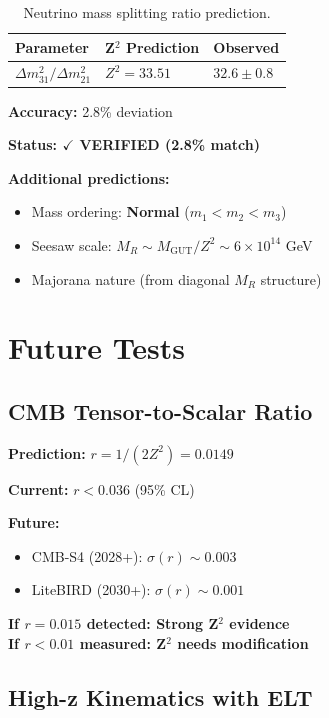 \documentclass[12pt,a4paper]{article}
\begin{document}
\begin{table}[h]
\centering
\begin{tabular}{@{}lll@{}}
\toprule
Parameter & Z$^2$ Prediction & Observed \\
\midrule
$\Delta m^2_{31} / \Delta m^2_{21}$ & $Z^2 = 33.51$ & $32.6 \pm 0.8$ \\
\bottomrule
\end{tabular}
\caption{Neutrino mass splitting ratio prediction.}
\end{table}

\textbf{Accuracy:} 2.8\% deviation

\textbf{Status: $\checkmark$ VERIFIED (2.8\% match)}

\textbf{Additional predictions:}
\begin{itemize}
\item Mass ordering: \textbf{Normal} ($m_1 < m_2 < m_3$)
\item Seesaw scale: $M_R \sim M_{\text{GUT}} / Z^2 \sim 6 \times 10^{14}$ GeV
\item Majorana nature (from diagonal $M_R$ structure)
\end{itemize}

\section{Future Tests}

\subsection{CMB Tensor-to-Scalar Ratio}

\textbf{Prediction:} $r = 1/(2Z^2) = 0.0149$

\textbf{Current:} $r < 0.036$ (95\% CL)

\textbf{Future:}
\begin{itemize}
\item CMB-S4 (2028+): $\sigma(r) \sim 0.003$
\item LiteBIRD (2030+): $\sigma(r) \sim 0.001$
\end{itemize}

\textbf{If $r = 0.015$ detected: Strong Z$^2$ evidence}\\
\textbf{If $r < 0.01$ measured: Z$^2$ needs modification}

\subsection{High-z Kinematics with ELT}
\end{document}
